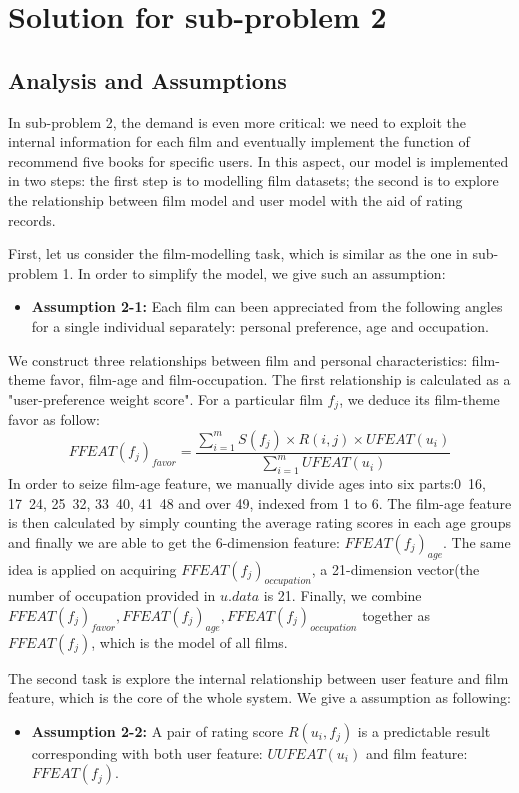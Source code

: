 \section{Solution for sub-problem 2}
\subsection{Analysis and Assumptions}
In sub-problem 2, the demand is even more critical: we need to exploit the internal information for each film and eventually implement the function of recommend five books for specific users. In this aspect, our model is implemented in two steps: the first step is to modelling film datasets; the second is to explore the relationship between film model and user model with the aid of rating records.

First, let us consider the film-modelling task, which is similar as the one in sub-problem 1. In order to simplify the model, we give such an assumption:

\begin{itemize}
\item \textbf{Assumption 2-1:} Each film can been appreciated from the following angles for a single individual separately: personal preference, age and occupation.
\end{itemize} 


We construct three relationships between film and personal characteristics: film-theme favor, film-age and film-occupation. The first relationship is calculated as a "user-preference weight score".
For a particular film $f_{j}$, we deduce its film-theme favor as follow:
\begin{equation}
FFEAT(f_{j})_{favor}=\dfrac {\sum ^{m}_{i=1}S\left( f_{j}\right) \times R\left( i,j\right) \times UFEAT\left( u_{i}\right) }{\sum ^{m}_{i=1}UFEAT\left( u_{i}\right) }
\end{equation}
In order to seize film-age feature, we manually divide ages into six parts:0~16, 17~24, 25~32, 33~40, 41~48 and over 49, indexed from 1 to 6. The film-age feature is then calculated by simply counting the average rating scores in each age groups and finally we are able to get the 6-dimension feature: $FFEAT(f_{j})_{age}$. The same idea is applied on acquiring $FFEAT(f_{j})_{occupation}$, a 21-dimension vector(the number of occupation provided in $u.data$ is 21. Finally, we combine $FFEAT(f_{j})_{favor}, FFEAT(f_{j})_{age}, FFEAT(f_{j})_{occupation}$ together as $FFEAT(f_{j})$, which is the model of all films. 

The second task is explore the internal relationship between user feature and film feature, which is the core of the whole system. We give a assumption as following:
\begin{itemize}
\item \textbf{Assumption 2-2:} A pair of rating score $R(u_{i},f_{j})$ is a predictable result corresponding with both user feature: $UUFEAT(u_{i})$ and film feature: $FFEAT(f_{j})$. 
\end{itemize} 
